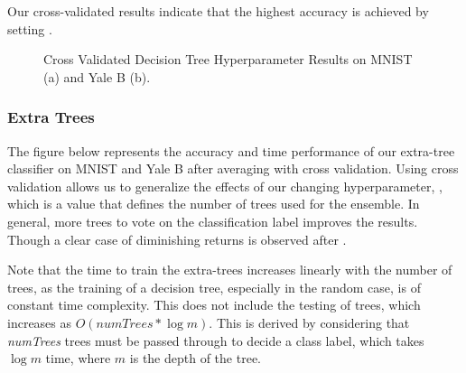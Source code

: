 Our cross-validated results indicate that the highest accuracy is achieved by setting .
%
\begin{figure}[H]
    \centering
    \caption{Cross Validated Decision Tree Hyperparameter Results on MNIST (a) and Yale B (b).}
\end{figure}

\subsubsection{Extra Trees}

The figure below represents the accuracy and time performance of our extra-tree classifier on MNIST and Yale B after averaging with cross validation. Using cross validation allows us to generalize the effects of our changing hyperparameter, , which is a value that defines the number of trees used for the ensemble. In general, more trees to vote on the classification label improves the results. Though a clear case of diminishing returns is observed after .

Note that the time to train the extra-trees increases linearly with the number of trees, as the training of a decision tree, especially in the random case, is of constant time complexity. This does not include the testing of trees, which increases as $O(numTrees\ast \log m)$. This is derived by considering that \textit{numTrees} trees must be passed through to decide a class label, which takes $\log m$ time, where $m$ is the depth of the tree.

